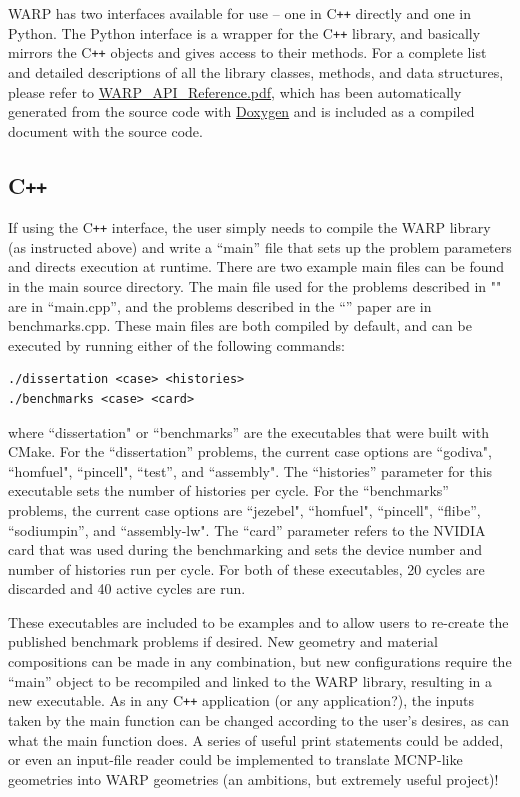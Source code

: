 \documentclass[twoside,a4paper]{refart}
\begin{document}
WARP has two interfaces available for use -- one in C\texttt{++} directly and one in Python.  The Python 
interface is a wrapper for the C\texttt{++} library, and basically mirrors the C\texttt{++} objects and gives access to their methods.  For
a complete list and detailed descriptions of all the library classes, methods, and data structures, please
refer to \href{run:WARP_API_Reference.pdf}{WARP\_API\_Reference.pdf}, which has been automatically generated from the source code with
\href{http://www.doxygen.org}{Doxygen} and is included as a compiled document with the source code.

\subsection{C\texttt{++}}

If using the C\texttt{++} interface, the user simply needs to compile the WARP library (as instructed above) and 
write a ``main'' file that sets up the problem parameters and directs execution at runtime.  There are two example main files can be found in the main source directory. The main file used for the problems described in "" are in ``main.cpp'', and the problems described in the ``'' paper are in benchmarks.cpp.  These main files are both compiled by default, and can be executed by running either of the following commands:

\begin{verbatim}
./dissertation <case> <histories>
./benchmarks <case> <card>
\end{verbatim}

where ``dissertation" or ``benchmarks'' are the executables that were built with CMake.  For the ``dissertation'' problems, the current case options are ``godiva",
``homfuel", ``pincell", ``test'', and ``assembly".  The ``histories'' parameter for this executable sets the number of histories per cycle. For the ``benchmarks'' problems, the current case options are ``jezebel", ``homfuel", ``pincell", ``flibe'', ``sodiumpin'', and ``assembly-lw".   The ``card'' parameter refers to the NVIDIA card that was used during the benchmarking and sets the device number and number of histories run per cycle.  For both of these executables, 20 cycles are discarded and 40 active cycles are run.

These executables are included to be examples and to allow users to re-create the published benchmark problems if desired.  New geometry and material compositions can be made in any combination, but new configurations require the ``main'' object to be recompiled and linked to the WARP library, resulting in a new executable.  As in any C\texttt{++}  application (or any application?), the inputs taken by the main function can be changed according to the user's desires, as can what the main function does.  A series of useful print statements could be added, or even an input-file reader could be implemented to translate MCNP-like geometries into WARP geometries (an ambitions, but extremely useful project)!
\end{document}
